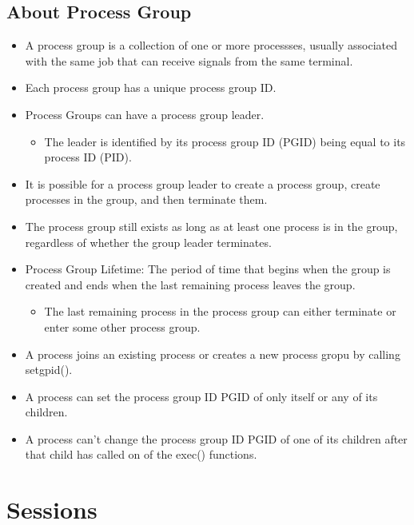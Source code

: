\documentclass{article}
\begin{document}
\subsection{About Process Group}
\begin{itemize}
    \item A process group is a collection of one or more processses, usually associated with the same job that can receive signals from the same terminal.
    \item Each process group has a unique process group ID.
    \item Process Groups can have a process group leader.
        \begin{itemize}
            \item The leader is identified by its process group ID (PGID) being equal to its process ID (PID).
        \end{itemize}
    \item It is possible for a process group leader to create a process group, create processes in the group, and then terminate them.
    \item The process group still exists as long as at least one process is in the group, regardless of whether the group leader terminates.
    \item Process Group Lifetime: The period of time that begins when the group is created and ends when the last remaining process leaves the group.
        \begin{itemize}
            \item The last remaining process in the process group can either terminate or enter some other process group.
        \end{itemize}
    \item A process joins an existing process or creates a new process gropu by calling setgpid().
    \item A process can set the process group ID PGID of only itself or any of its children.
    \item A process can't change the process group ID PGID of one of its children after that child has called on of the exec() functions.
\end{itemize}

\section{Sessions}
\end{document}
